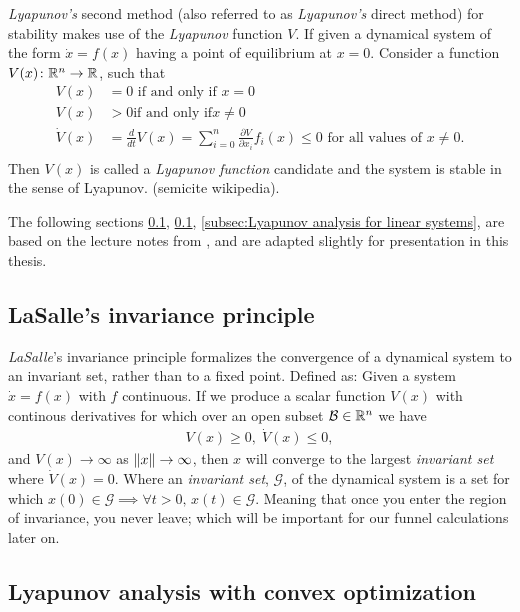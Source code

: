 \textit{Lyapunov's} second method (also referred to as \textit{Lyapunov's}
direct method) for stability makes use of the \textit{Lyapunov} function \(V\).
If given a dynamical system of the form \(\dot{x} = f(x)\) having a point of
equilibrium at \(x = 0\). Consider a function \(V(x) \colon \mathbb{R}^n \rightarrow
\mathbb{R}\), such that
\begin{align*}
  V(x) &= 0 \text{ if and only if } x = 0 \\
  V(x) &> 0 \text{if and only if} x \neq 0 \\
  \dot{V}(x) &= \frac{d}{dt}V(x) = \sum_{i=0}^{n} \frac{\partial V}{\partial x_i} f_i(x) \leq 0 \text{ for all values of } x \neq 0. \\
\end{align*}
Then \(V(x)\) is called a \textit{Lyapunov function} candidate and the system is
stable in the sense of Lyapunov. (semicite wikipedia).

The following sections \ref{subsec:LaSalle's invariance principle},
\ref{subsec:LaSalle's invariance principle}, \ref{subsec:Lyapunov analysis for
  linear systems}, are based on the lecture notes from
\cite{tedrakeUnderactuatedRoboticsAlgorithms2019}, and are adapted slightly for
presentation in this thesis.

\subsection{LaSalle's invariance principle}
\label{subsec:LaSalle's invariance principle}

\textit{LaSalle}'s invariance principle formalizes the convergence of a
dynamical system to an invariant set, rather than to a fixed point. Defined as:
Given a system \(\dot{x} = f(x)\) with \(f\) continuous. If we produce a scalar
function \(V(x)\) with continous derivatives for which over an open subset
\(\mathcal{B} \in \mathbb{R}^n\) we have
\begin{align*}
  V(x) \geq 0, \; \dot{V}(x) \leq 0,
\end{align*}
and \(V(x) \rightarrow \infty\) as \(\lVert x\rVert \rightarrow \infty\), then \(x\)
will converge to the largest \textit{invariant set} where \(\dot{V}(x) = 0\).
Where an \textit{invariant set}, \(\mathcal{G}\), of the dynamical system is a
set for which \(x(0) \in \mathcal{G} \implies \forall t > 0,\, x(t) \in
\mathcal{G}\). Meaning that once you enter the region of invariance, you never
leave; which will be important for our funnel calculations later on.

\subsection{Lyapunov analysis with convex optimization}
\label{subsec:Lyapunov analysis with convex optimization}

